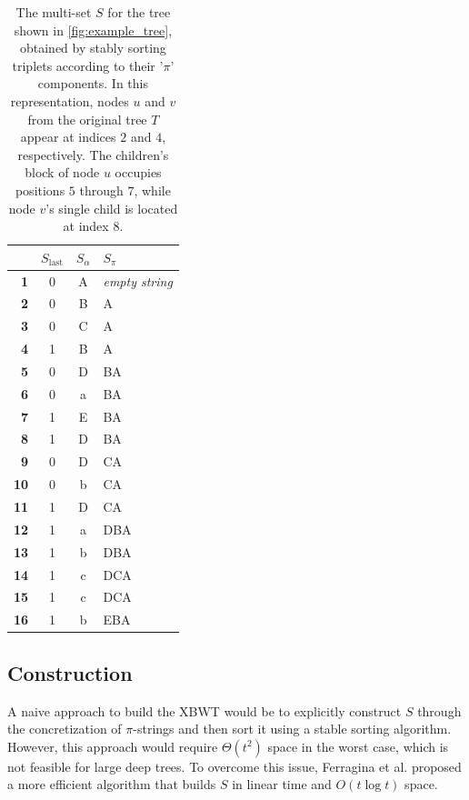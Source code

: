 \begin{table}[H]
    \centering
    \begin{tabular}{r c c l}
    \hline\hline
    \textbf{} & \textbf{$S_{\text{last}}$} & \textbf{$S_{\alpha}$} & \textbf{$S_{\pi}$} \\
    \hline
    \textbf{1} & 0 & A & \textit{empty string} \\
    \textbf{2} & 0 & B & A \\
    \textbf{3} & 0 & C & A \\
    \textbf{4} & 1 & B & A \\
    \textbf{5} & 0 & D & BA \\
    \textbf{6} & 0 & a & BA \\
    \textbf{7} & 1 & E & BA \\
    \textbf{8} & 1 & D & BA \\
    \textbf{9} & 0 & D & CA \\
    \textbf{10} & 0 & b & CA \\
    \textbf{11} & 1 & D & CA \\
    \textbf{12} & 1 & a & DBA \\
    \textbf{13} & 1 & b & DBA \\
    \textbf{14} & 1 & c & DCA \\
    \textbf{15} & 1 & c & DCA \\
    \textbf{16} & 1 & b & EBA \\
    \hline\hline
    \end{tabular}
    \caption{The multi-set $S$ for the tree shown in \cref{fig:example_tree}, obtained by stably sorting triplets according to their '$\pi$' components. In this representation, nodes $u$ and $v$ from the original tree $T$ appear at indices $2$ and $4$, respectively. The children's block of node $u$ occupies positions $5$ through $7$, while node $v$'s single child is located at index $8$.}
    \label{tab:xbwt_example}
\end{table}

\subsection{Construction}
A naive approach to build the XBWT would be to explicitly construct $S$ through the concretization of $\pi$-strings and then sort it using a stable sorting algorithm. However, this approach would require $\Theta(t^2)$ space in the worst case, which is not feasible for large deep trees. To overcome this issue, Ferragina et al. \cite{ferragina2009compressing} proposed a more efficient algorithm that builds $S$ in linear time and $O(t \log t)$ space.

